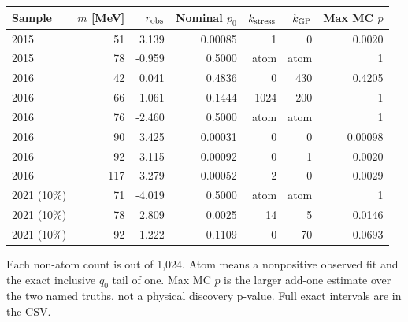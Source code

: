 \begin{center}\small
\begin{tabular}{lrrrrrr}\toprule
Sample & $m$ [MeV] & $r_{\rm obs}$ & Nominal $p_0$ & $k_{\rm stress}$ & $k_{\rm GP}$ & Max MC $p$\\\midrule
2015 & 51 & 3.139 & 0.00085 & 1 & 0 & 0.0020\\
2015 & 78 & -0.959 & 0.5000 & atom & atom & 1\\
2016 & 42 & 0.041 & 0.4836 & 0 & 430 & 0.4205\\
2016 & 66 & 1.061 & 0.1444 & 1024 & 200 & 1\\
2016 & 76 & -2.460 & 0.5000 & atom & atom & 1\\
2016 & 90 & 3.425 & 0.00031 & 0 & 0 & 0.00098\\
2016 & 92 & 3.115 & 0.00092 & 0 & 1 & 0.0020\\
2016 & 117 & 3.279 & 0.00052 & 2 & 0 & 0.0029\\
2021 (10\%) & 71 & -4.019 & 0.5000 & atom & atom & 1\\
2021 (10\%) & 78 & 2.809 & 0.0025 & 14 & 5 & 0.0146\\
2021 (10\%) & 92 & 1.222 & 0.1109 & 0 & 70 & 0.0693\\
\bottomrule\end{tabular}\end{center}
{\small Each non-atom count is out of 1,024. Atom means a nonpositive observed fit and the exact inclusive $q_0$ tail of one. Max MC $p$ is the larger add-one estimate over the two named truths, not a physical discovery p-value. Full exact intervals are in the CSV.}

